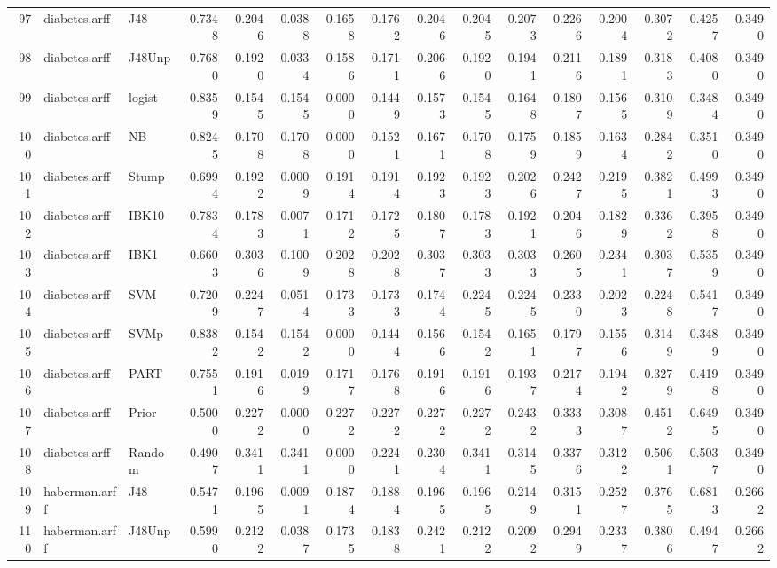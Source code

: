 \documentclass {article}
\begin{document}
\begin{table}[ht]
\begin{tabular}{rllrrrrrrrrrrrrr}
  97 & diabetes.arff & J48 & 0.7348 & 0.2046 & 0.0388 & 0.1658 & 0.1762 & 0.2046 & 0.2045 & 0.2073 & 0.2266 & 0.2004 & 0.3072 & 0.4257 & 0.3490 \\ 
  98 & diabetes.arff & J48Unp & 0.7680 & 0.1920 & 0.0334 & 0.1586 & 0.1711 & 0.2066 & 0.1920 & 0.1941 & 0.2116 & 0.1891 & 0.3183 & 0.4080 & 0.3490 \\ 
  99 & diabetes.arff & logist & 0.8359 & 0.1545 & 0.1545 & 0.0000 & 0.1449 & 0.1573 & 0.1545 & 0.1648 & 0.1807 & 0.1565 & 0.3109 & 0.3484 & 0.3490 \\ 
  100 & diabetes.arff & NB & 0.8245 & 0.1708 & 0.1708 & 0.0000 & 0.1521 & 0.1671 & 0.1708 & 0.1759 & 0.1859 & 0.1634 & 0.2842 & 0.3510 & 0.3490 \\ 
  101 & diabetes.arff & Stump & 0.6994 & 0.1922 & 0.0009 & 0.1914 & 0.1914 & 0.1923 & 0.1923 & 0.2026 & 0.2427 & 0.2195 & 0.3821 & 0.4993 & 0.3490 \\ 
  102 & diabetes.arff & IBK10 & 0.7834 & 0.1783 & 0.0071 & 0.1712 & 0.1725 & 0.1807 & 0.1783 & 0.1921 & 0.2046 & 0.1829 & 0.3362 & 0.3958 & 0.3490 \\ 
  103 & diabetes.arff & IBK1 & 0.6603 & 0.3036 & 0.1009 & 0.2028 & 0.2028 & 0.3037 & 0.3033 & 0.3033 & 0.2605 & 0.2341 & 0.3037 & 0.5359 & 0.3490 \\ 
  104 & diabetes.arff & SVM & 0.7209 & 0.2247 & 0.0514 & 0.1733 & 0.1733 & 0.1744 & 0.2245 & 0.2245 & 0.2330 & 0.2023 & 0.2248 & 0.5417 & 0.3490 \\ 
  105 & diabetes.arff & SVMp & 0.8382 & 0.1542 & 0.1542 & 0.0000 & 0.1444 & 0.1566 & 0.1542 & 0.1651 & 0.1797 & 0.1556 & 0.3149 & 0.3489 & 0.3490 \\ 
  106 & diabetes.arff & PART & 0.7551 & 0.1916 & 0.0199 & 0.1717 & 0.1768 & 0.1916 & 0.1916 & 0.1937 & 0.2174 & 0.1942 & 0.3279 & 0.4198 & 0.3490 \\ 
  107 & diabetes.arff & Prior & 0.5000 & 0.2272 & 0.0000 & 0.2272 & 0.2272 & 0.2272 & 0.2272 & 0.2432 & 0.3333 & 0.3087 & 0.4512 & 0.6495 & 0.3490 \\ 
  108 & diabetes.arff & Random & 0.4907 & 0.3411 & 0.3411 & 0.0000 & 0.2241 & 0.2304 & 0.3411 & 0.3145 & 0.3376 & 0.3122 & 0.5061 & 0.5037 & 0.3490 \\ 
  109 & haberman.arff & J48 & 0.5471 & 0.1965 & 0.0091 & 0.1874 & 0.1884 & 0.1965 & 0.1965 & 0.2149 & 0.3151 & 0.2527 & 0.3765 & 0.6813 & 0.2662 \\ 
  110 & haberman.arff & J48Unp & 0.5990 & 0.2122 & 0.0387 & 0.1735 & 0.1838 & 0.2421 & 0.2122 & 0.2092 & 0.2949 & 0.2337 & 0.3806 & 0.4947 & 0.2662 \\ 

\end{tabular}
\end{table}
\end{document}
